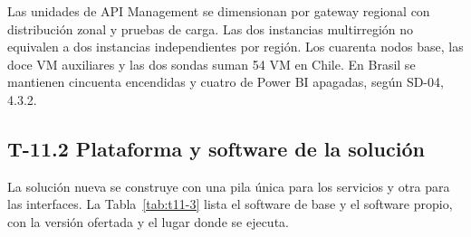 \documentclass[11pt]{article}
\begin{document}
Las unidades de API Management se dimensionan por gateway regional con distribución zonal y pruebas de carga. Las dos instancias multirregión no equivalen a dos instancias independientes por región. Los cuarenta nodos base, las doce VM auxiliares y las dos sondas suman 54 VM en Chile. En Brasil se mantienen cincuenta encendidas y cuatro de Power BI apagadas, según SD-04, 4.3.2.

\subsection{T-11.2 Plataforma y software de la solución}\label{t-11-2}

La solución nueva se construye con una pila única para los servicios y otra para las interfaces. La Tabla~\mbox{\ref{tab:t11-3}} lista el software de base y el software propio, con la versión ofertada y el lugar donde se ejecuta.
\end{document}
